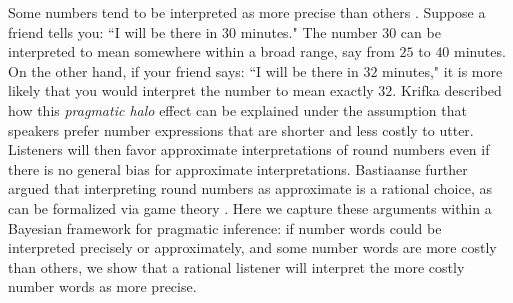 \documentclass{article} %
\begin{document}
Some numbers tend to be interpreted as more precise than others \cite{lasersohn1999pragmatic}. Suppose a friend tells you: ``I will be there in $30$ minutes." The number $30$ can be interpreted to mean somewhere within a broad range, say from $25$ to $40$ minutes. On the other hand, if your friend says: ``I will be there in $32$ minutes," it is more likely that you would interpret the number to mean exactly $32$. 
Krifka \cite{krifka2007approximate} described how this \emph{pragmatic halo} effect can be explained under the assumption that speakers prefer number expressions that are shorter and less costly to utter. Listeners will then favor approximate interpretations of round numbers even if there is no general bias for approximate interpretations. Bastiaanse \cite{bastiaanse2011rationality} further argued that interpreting round numbers as approximate is a rational choice, as can be formalized via game theory \cite{jaeger}. 
Here we capture these arguments within a Bayesian framework for pragmatic inference: if number words could be interpreted precisely or approximately, and some number words are more costly than others, we show that a rational listener will interpret the more costly number words as more precise.
\end{document}
